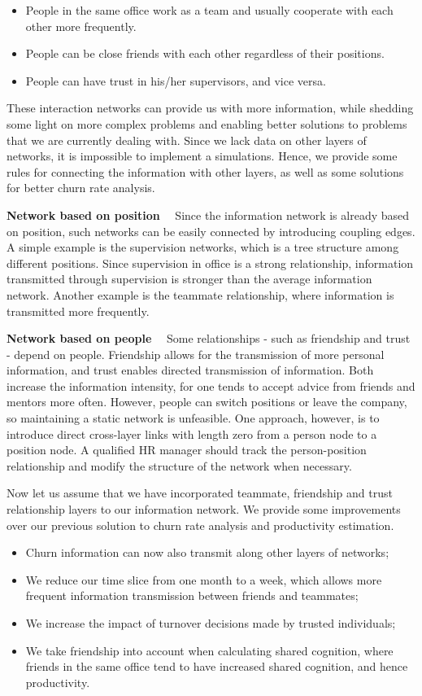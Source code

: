 \documentclass[tcn = 37075, sheet = false, abstract = false]{mcmthesis}
\begin{document}
\begin{itemize}
\item People in the same office work as a team and usually cooperate with each other more frequently. 
\item People can be close friends with each other regardless of their positions.
\item People can have trust in his/her supervisors, and vice versa.
\end{itemize}

These interaction networks can provide us with more information, while shedding some light on more complex problems and enabling better solutions to problems that we are currently dealing with. Since we lack data on other layers of networks, it is impossible to implement a simulations. Hence, we provide some rules for connecting the information with other layers, as well as some solutions for better churn rate analysis.


\noindent \textbf{Network based on position} \  \  Since the information network is already based on position, such networks can be easily connected by introducing coupling edges. A simple example is the supervision networks, which is a tree structure among different positions. Since supervision in office is a strong relationship, information transmitted through supervision is stronger than the average information network. Another example is the teammate relationship, where information is transmitted more frequently.


\noindent \textbf{Network based on people} \ \ Some relationships - such as friendship and trust - depend on people. Friendship allows for the transmission of more personal information, and trust enables directed transmission of information. Both increase the information intensity, for one tends to accept advice from friends and mentors more often. However, people can switch positions or leave the company, so maintaining a static network is unfeasible. One approach, however, is to introduce direct cross-layer links with length zero from a person node to a position node. A qualified HR manager should track the person-position relationship and modify the structure of the network when necessary.

Now let us assume that we have incorporated teammate, friendship and trust relationship layers to our information network. We provide some improvements over our previous solution to churn rate analysis and productivity estimation.
\begin{itemize}
\item Churn information can now also transmit along other layers of networks;
\item We reduce our time slice from one month to a week, which allows more frequent information transmission between friends and teammates;
\item We increase the impact of turnover decisions made by trusted individuals;
\item We take friendship into account when calculating shared cognition, where friends in the same office tend to have increased shared cognition, and hence productivity.

\end{itemize}
\end{document}
